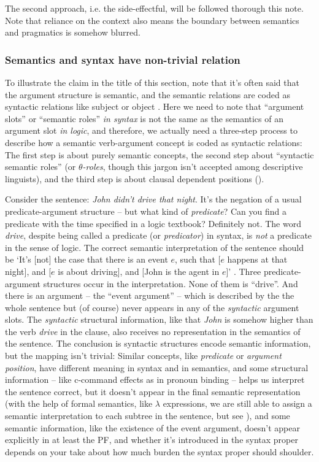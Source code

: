\documentclass[UTF8, a4paper, oneside, scheme=plain]{ctexrep}
\newcommand*{\citepage}[1]{p.~{#1}}
\newcommand*{\term}[1]{\emph{#1}}
\newcommand{\corpus}[1]{\emph{#1}}
\newcommand{\translate}[1]{`#1'}
\begin{document}
The second approach, i.e. the side-effectful,
will be followed thorough this note.
Note that reliance on the context also means the boundary between semantics and pragmatics 
is somehow blurred.

\subsubsection{Semantics and syntax have non-trivial relation}\label{sec:semantics-argument}

To illustrate the claim in the title of this section, note that
it's often said that the argument structure is semantic, 
and the semantic relations are coded as syntactic relations like subject or object
\citep[\citepage{111}]{dixon2005semantic}.
Here we need to note that ``argument slots'' or ``semantic roles'' \emph{in syntax}
is not the same as the semantics of an argument slot \emph{in logic},
and therefore,
we actually need a three-step process to describe how a semantic verb-argument concept 
is coded as syntactic relations:
The first step is about purely semantic concepts,
the second step about ``syntactic semantic roles''
(or \term{$\theta$-roles}, though this jargon isn't accepted among descriptive linguists),
and the third step is about clausal dependent positions 
().

Consider the sentence: \corpus{John didn't drive that night}. 
It's the negation of a usual predicate-argument structure
-- but what kind of \term{predicate}?
Can you find a predicate with the time specified in a logic textbook?
Definitely not. 
The word \corpus{drive}, despite being called a predicate (or \term{predicator}) in syntax,
is \emph{not} a predicate in the sense of logic.
The correct semantic interpretation of the sentence should be 
\translate{It's [not] the case that there is an event $e$, such that
[$e$ happens at that night], and [$e$ is about driving], 
and [John is the agent in $e$]} \citep{zeijlstra2013}.
Three predicate-argument structures occur in the interpretation.
None of them is ``drive''.
And there is an argument -- the ``event argument'' --
which is described by the the whole sentence but (of course) 
never appears in any of the \emph{syntactic} argument slots.
The \emph{syntactic} structural information,
like that \corpus{John} is somehow higher than the verb \corpus{drive} in the clause,
also receives no representation in the semantics of the sentence.
The conclusion is syntactic structures encode semantic information,
but the mapping isn't trivial:
Similar concepts, like \term{predicate} or \term{argument position},
have different meaning in syntax and in semantics, and 
some structural information -- like c-command effects as in pronoun binding --
helps us interpret the sentence correct,
but it doesn't appear in the final semantic representation 
(with the help of formal semantics, like $\lambda$ expressions,
we are still able to assign a semantic interpretation to each subtree in the sentence,
but see ),
and some semantic information, like the existence of the event argument,
doesn't appear explicitly in at least the PF, 
and whether it's introduced in the syntax proper depends on 
your take about how much burden the syntax proper should shoulder.
\end{document}
